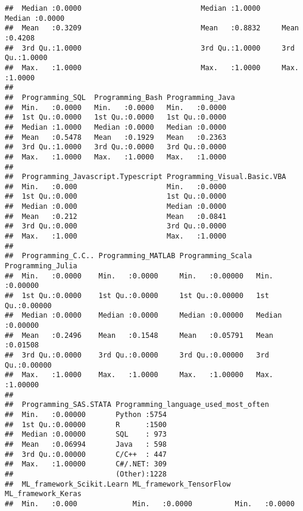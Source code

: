 \documentclass[
]{article}
\begin{document}
\begin{verbatim}
##  Median :0.0000                            Median :1.0000     Median :0.0000  
##  Mean   :0.3209                            Mean   :0.8832     Mean   :0.4208  
##  3rd Qu.:1.0000                            3rd Qu.:1.0000     3rd Qu.:1.0000  
##  Max.   :1.0000                            Max.   :1.0000     Max.   :1.0000  
##                                                                               
##  Programming_SQL  Programming_Bash Programming_Java
##  Min.   :0.0000   Min.   :0.0000   Min.   :0.0000  
##  1st Qu.:0.0000   1st Qu.:0.0000   1st Qu.:0.0000  
##  Median :1.0000   Median :0.0000   Median :0.0000  
##  Mean   :0.5478   Mean   :0.1929   Mean   :0.2363  
##  3rd Qu.:1.0000   3rd Qu.:0.0000   3rd Qu.:0.0000  
##  Max.   :1.0000   Max.   :1.0000   Max.   :1.0000  
##                                                    
##  Programming_Javascript.Typescript Programming_Visual.Basic.VBA
##  Min.   :0.000                     Min.   :0.0000              
##  1st Qu.:0.000                     1st Qu.:0.0000              
##  Median :0.000                     Median :0.0000              
##  Mean   :0.212                     Mean   :0.0841              
##  3rd Qu.:0.000                     3rd Qu.:0.0000              
##  Max.   :1.000                     Max.   :1.0000              
##                                                                
##  Programming_C.C.. Programming_MATLAB Programming_Scala Programming_Julia
##  Min.   :0.0000    Min.   :0.0000     Min.   :0.00000   Min.   :0.00000  
##  1st Qu.:0.0000    1st Qu.:0.0000     1st Qu.:0.00000   1st Qu.:0.00000  
##  Median :0.0000    Median :0.0000     Median :0.00000   Median :0.00000  
##  Mean   :0.2496    Mean   :0.1548     Mean   :0.05791   Mean   :0.01508  
##  3rd Qu.:0.0000    3rd Qu.:0.0000     3rd Qu.:0.00000   3rd Qu.:0.00000  
##  Max.   :1.0000    Max.   :1.0000     Max.   :1.00000   Max.   :1.00000  
##                                                                          
##  Programming_SAS.STATA Programming_language_used_most_often
##  Min.   :0.00000       Python :5754                        
##  1st Qu.:0.00000       R      :1500                        
##  Median :0.00000       SQL    : 973                        
##  Mean   :0.06994       Java   : 598                        
##  3rd Qu.:0.00000       C/C++  : 447                        
##  Max.   :1.00000       C#/.NET: 309                        
##                        (Other):1228                        
##  ML_framework_Scikit.Learn ML_framework_TensorFlow ML_framework_Keras
##  Min.   :0.000             Min.   :0.0000          Min.   :0.0000    

\end{verbatim}
\end{document}
